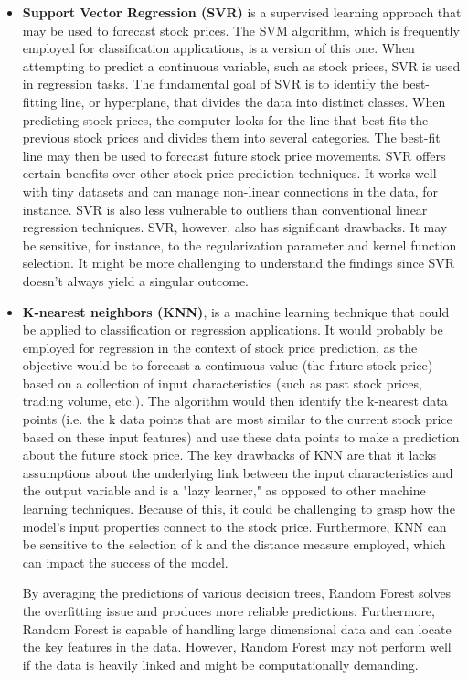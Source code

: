 \documentclass[a4paper]{article}
\begin{document}
\begin{itemize}[leftmargin=7.5pt]
    \item \textbf{Support Vector Regression (SVR)} is a supervised learning approach that may be used to forecast stock prices. The SVM algorithm, which is frequently employed for classification applications, is a version of this one. When attempting to predict a continuous variable, such as stock prices, SVR is used in regression tasks. The fundamental goal of SVR is to identify the best-fitting line, or hyperplane, that divides the data into distinct classes. When predicting stock prices, the computer looks for the line that best fits the previous stock prices and divides them into several categories. The best-fit line may then be used to forecast future stock price movements. SVR offers certain benefits over other stock price prediction techniques. It works well with tiny datasets and can manage non-linear connections in the data, for instance. SVR is also less vulnerable to outliers than conventional linear regression techniques. SVR, however, also has significant drawbacks. It may be sensitive, for instance, to the regularization parameter and kernel function selection. It might be more challenging to understand the findings since SVR doesn't always yield a singular outcome.

    \item \textbf{K-nearest neighbors (KNN)}, is a machine learning technique that could be applied to classification or regression applications. It would probably be employed for regression in the context of stock price prediction, as the objective would be to forecast a continuous value (the future stock price) based on a collection of input characteristics (such as past stock prices, trading volume, etc.). The algorithm would then identify the k-nearest data points (i.e. the k data points that are most similar to the current stock price based on these input features) and use these data points to make a prediction about the future stock price. The key drawbacks of KNN are that it lacks assumptions about the underlying link between the input characteristics and the output variable and is a "lazy learner," as opposed to other machine learning techniques. Because of this, it could be challenging to grasp how the model's input properties connect to the stock price. Furthermore, KNN can be sensitive to the selection of k and the distance measure employed, which can impact the success of the model.

    By averaging the predictions of various decision trees, Random Forest solves the overfitting issue and produces more reliable predictions. Furthermore, Random Forest is capable of handling large dimensional data and can locate the key features in the data. However, Random Forest may not perform well if the data is heavily linked and might be computationally demanding.
    
\end{itemize}
\end{document}

